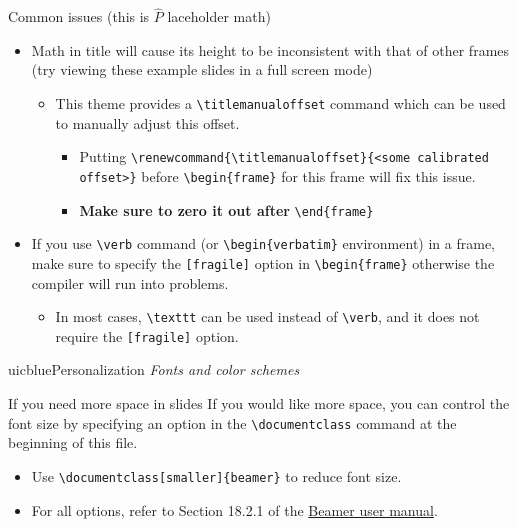 \documentclass{beamer}
\newcommand{\hrefcol}[2]{\textcolor{uihteal}{\href{#1}{#2}}}
\begin{document}
\begin{frame}[fragile]{Common issues (this is $\hat P$ laceholder math)}
\begin{itemize}
\item Math in title will cause its height to be inconsistent with that of other frames (try viewing these example slides in a full screen mode)
\begin{itemize}
\item This theme provides a \verb|\titlemanualoffset| command which can be used to manually adjust this offset.
\begin{itemize}
\item Putting \verb|\renewcommand{\titlemanualoffset}{<some calibrated offset>}| before \verb|\begin{frame}| for this frame will fix this issue.
\item \textbf{Make sure to zero it out after} \verb|\end{frame}|
\end{itemize}
\end{itemize}
\item If you use \verb|\verb| command (or \verb|\begin{verbatim}| environment) in a frame, make sure to specify the \texttt{[fragile]} option in \verb|\begin{frame}| otherwise the compiler will run into problems.
\begin{itemize}
\item In most cases, \verb|\texttt| can be used instead of \verb|\verb|, and it does not require the \texttt{[fragile]} option.
\end{itemize}
\end{itemize}
\end{frame}
\renewcommand{\titlemanualoffset}{0.0ex}



\begin{chapter}{uicblue}{Personalization}
\textit{Fonts and color schemes}
\end{chapter}


\begin{frame}[fragile]{If you need more space in slides}
If you would like more space, you can control the font size by specifying an option in the \verb|\documentclass| command at the beginning of this file.
\begin{itemize}
    \item Use \verb|\documentclass[smaller]{beamer}| to reduce font size.
    \item For all options, refer to Section 18.2.1 of the \hrefcol{https://www.ctan.org/tex-archive/macros/latex/contrib/beamer/doc/beameruserguide.pdf}{Beamer user manual}.
\end{itemize}
\end{frame}
\end{document}
